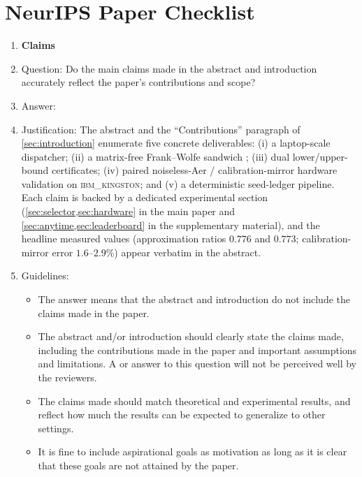 \section*{NeurIPS Paper Checklist}




\begin{enumerate}

\item {\bf Claims}
    \item[] Question: Do the main claims made in the abstract and introduction accurately reflect the paper's contributions and scope?
    \item[] Answer: \answerYes{} %
    \item[] Justification: The abstract and the ``Contributions'' paragraph of
        \cref{sec:introduction} enumerate five concrete deliverables: (i) a
        laptop-scale \MaxCut dispatcher; (ii) a matrix-free Frank--Wolfe
        sandwich \SDP; (iii) dual lower/upper-bound certificates; (iv) paired
        noiseless-Aer / calibration-mirror \QAOA hardware validation on
        \textsc{ibm\_kingston}; and (v) a deterministic seed-ledger pipeline.
        Each claim is backed by a dedicated experimental section
        (\cref{sec:selector,sec:hardware} in the main paper and
        \cref{sec:anytime,sec:leaderboard} in the supplementary material),
        and the headline measured values (approximation ratios $0.776$ and
        $0.773$; calibration-mirror error $1.6$--$2.9\%$) appear verbatim
        in the abstract.
    \item[] Guidelines:
    \begin{itemize}
        \item The answer \answerNA{} means that the abstract and introduction do not include the claims made in the paper.
        \item The abstract and/or introduction should clearly state the claims made, including the contributions made in the paper and important assumptions and limitations. A \answerNo{} or \answerNA{} answer to this question will not be perceived well by the reviewers.
        \item The claims made should match theoretical and experimental results, and reflect how much the results can be expected to generalize to other settings.
        \item It is fine to include aspirational goals as motivation as long as it is clear that these goals are not attained by the paper.
    \end{itemize}


\end{enumerate}
